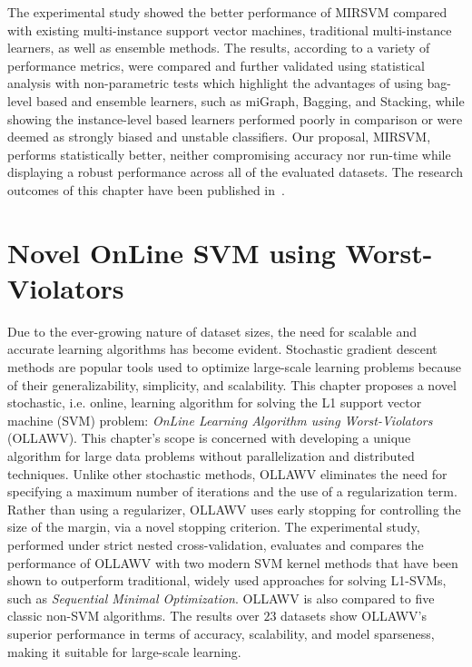 \documentclass[reqno]{vcuthesis}
\numberwithin{equation}{chapter}
\begin{document}
The experimental study showed the better performance of MIRSVM compared with existing multi-instance support vector machines, traditional multi-instance learners, as well as ensemble methods. The results, according to a variety of performance metrics, were compared and further validated using statistical analysis with non-parametric tests which highlight the advantages of using bag-level based and ensemble learners, such as miGraph, Bagging, and Stacking, while showing the instance-level based learners performed poorly in comparison or were deemed as strongly biased and unstable classifiers. Our proposal, MIRSVM, performs statistically better, neither compromising accuracy nor run-time while displaying a robust performance across all of the evaluated datasets. The research outcomes of this chapter have been published in~\cite{melki2018mirsvm}.

\chapter{Novel OnLine SVM using Worst-Violators}\label{chap:ollawv}
Due to the ever-growing nature of dataset sizes, the need for scalable and accurate learning algorithms has become evident. Stochastic gradient descent methods are popular tools used to optimize large-scale learning problems because of their generalizability, simplicity, and scalability. This chapter proposes a novel stochastic, i.e. online, learning algorithm for solving the L1 support vector machine (SVM) problem: \textit{OnLine Learning Algorithm using Worst-Violators} (OLLAWV). This chapter's scope is concerned with developing a unique algorithm for large data problems without parallelization and distributed techniques. Unlike other stochastic methods, OLLAWV eliminates the need for specifying a maximum number of iterations and the use of a regularization term. Rather than using a regularizer, OLLAWV uses early stopping for controlling the size of the margin, via a novel stopping criterion. The experimental study, performed under strict nested cross-validation, evaluates and compares the performance of OLLAWV with two modern SVM kernel methods that have been shown to outperform traditional, widely used approaches for solving L1-SVMs, such as \textit{Sequential Minimal Optimization}. OLLAWV is also compared to five classic non-SVM algorithms. The results over $23$ datasets show OLLAWV's superior performance in terms of accuracy, scalability, and model sparseness, making it suitable for large-scale learning.
\end{document}
